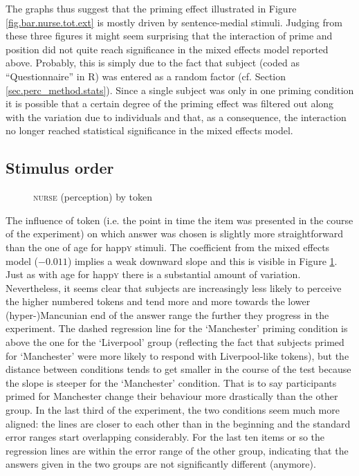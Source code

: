 The graphs thus suggest that the priming effect illustrated in Figure \ref{fig.bar.nurse.tot.ext} is mostly driven by sentence-medial stimuli.
Judging from these three figures  it might seem surprising that the interaction of prime and position did not quite reach significance in the mixed effects model reported above.
Probably, this is simply due to the fact that subject (coded as ``Questionnaire'' in R) was entered as a random factor (cf. Section \ref{sec.perc_method.stats}).
Since a single subject was only in one priming condition it is possible that a certain degree of the priming effect was filtered out along with the variation due to individuals and that, as a consequence, the interaction no longer reached statistical significance in the mixed effects model.

\subsection{Stimulus order}
\label{sec.perc_res.nurse.order}

\begin{figure}[h]
	\centering
		\resizebox{.49\linewidth}{!}{} 
	\caption{\textsc{nurse} (perception) by token}
	\label{fig.scatter.nurse.ext.token}
\end{figure}

The influence of token (i.e. the point in time the item was presented in the course of the experiment) on which answer was chosen is slightly more straightforward than the one of age for happ\textsc{y} stimuli.
The coefficient from the mixed effects model (\ensuremath{-0.011}) implies a weak downward slope and this is visible in Figure \ref{fig.scatter.nurse.ext.token}.
Just as with age for happ\textsc{y} there is a substantial amount of variation.
Nevertheless, it seems clear that subjects are increasingly less likely to perceive the higher numbered tokens and tend more and more towards the lower (hyper-)Mancunian end of the answer range the further they progress in the experiment.
The dashed regression line for the `Manchester' priming condition is above the one for the `Liverpool' group (reflecting the fact that subjects primed for `Manchester' were more likely to respond with Liverpool-like tokens), but the distance between conditions tends to get smaller in the course of the test because the slope is steeper for the `Manchester' condition. That is to say participants primed for Manchester change their behaviour more drastically than the other group.
In the last third of the experiment, the two conditions seem much more aligned: the lines are closer to each other than in the beginning and the standard error ranges start overlapping considerably.
For the last ten items or so the regression lines are within the error range of the other group, indicating that the answers given in the two groups are not significantly different (anymore).

